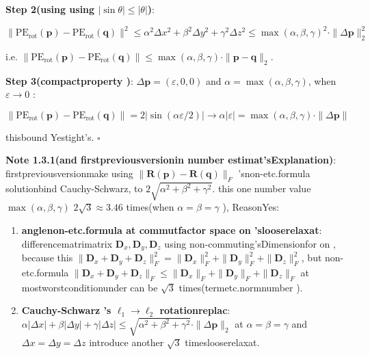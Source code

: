 \documentclass[
  12pt,
]{article}
\begin{document}
\textbf{Step 2(using using  \(|\sin\theta| \leq |\theta|\))}: 

\[\|\text{PE}_{\text{rot}}(\mathbf{p}) - \text{PE}_{\text{rot}}(\mathbf{q})\|^2 \leq \alpha^2\Delta x^2 + \beta^2\Delta y^2 + \gamma^2\Delta z^2 \leq \max(\alpha, \beta, \gamma)^2 \cdot \|\Delta\mathbf{p}\|_2^2\]

i.e.
\(\|\text{PE}_{\text{rot}}(\mathbf{p}) - \text{PE}_{\text{rot}}(\mathbf{q})\| \leq \max(\alpha, \beta, \gamma) \cdot \|\mathbf{p} - \mathbf{q}\|_2\). 

\textbf{Step 3(compactproperty )}:  \(\Delta\mathbf{p} = (\varepsilon, 0, 0)\)
and  \(\alpha = \max(\alpha, \beta, \gamma)\), when  \(\varepsilon \to 0\)
: 

\[\|\text{PE}_{\text{rot}}(\mathbf{p}) - \text{PE}_{\text{rot}}(\mathbf{q})\| = 2|\sin(\alpha\varepsilon/2)| \to \alpha|\varepsilon| = \max(\alpha, \beta, \gamma) \cdot \|\Delta\mathbf{p}\|\]

thisbound Yestight's. \(\square\)

\textbf{Note 1.3.1(and firstpreviousversionin number estimat'sExplanation)}: firstpreviousversionmake using 
\(\|\mathbf{R}(\mathbf{p}) - \mathbf{R}(\mathbf{q})\|_F\)
'snon-etc.formula solutionbind Cauchy-Schwarz, to 
\(2\sqrt{\alpha^2 + \beta^2 + \gamma^2}\). this one number value 
\(\max(\alpha, \beta, \gamma)\)  \(2\sqrt{3} \approx 3.46\) times(when 
\(\alpha = \beta = \gamma\) ), ReasonYes: 

\begin{enumerate}
\def\labelenumi{\arabic{enumi}.}
\item
  \textbf{anglenon-etc.formula at  commutfactor space on 'slooserelaxat}: differencematrimatrix 
  \(\mathbf{D}_x, \mathbf{D}_y, \mathbf{D}_z\)
  using non-commuting'sDimensionfor on , because this
  \(\|\mathbf{D}_x + \mathbf{D}_y + \mathbf{D}_z\|_F^2 = \|\mathbf{D}_x\|_F^2 + \|\mathbf{D}_y\|_F^2 + \|\mathbf{D}_z\|_F^2\), but non-etc.formula 
  \(\|\mathbf{D}_x + \mathbf{D}_y + \mathbf{D}_z\|_F \leq \|\mathbf{D}_x\|_F + \|\mathbf{D}_y\|_F + \|\mathbf{D}_z\|_F\)
  at mostworstconditionunder can be  \(\sqrt{3}\) times(termetc.normnumber ). 
\item
  \textbf{Cauchy-Schwarz 's \(\ell_1 \to \ell_2\)
  rotationreplac}: \(\alpha|\Delta x| + \beta|\Delta y| + \gamma|\Delta z| \leq \sqrt{\alpha^2 + \beta^2 + \gamma^2} \cdot \|\Delta\mathbf{p}\|_2\)
  at  \(\alpha=\beta=\gamma\) and  \(\Delta x = \Delta y = \Delta z\)
  introduce another  \(\sqrt{3}\) timeslooserelaxat. 
\end{enumerate}
\end{document}
